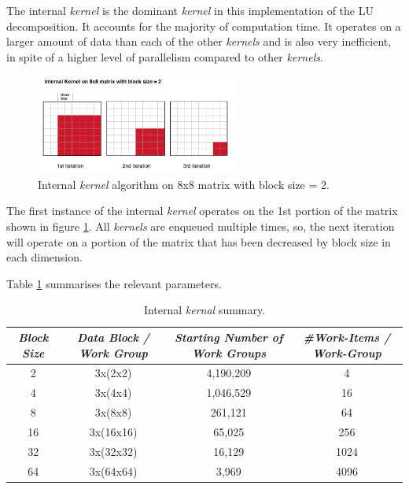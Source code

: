 \par{The internal \emph{kernel} is the dominant \emph{kernel} in this implementation of the 
    LU decomposition. It accounts for the majority of computation time. 
    It operates on a larger amount of data than each of the other \emph{kernels}
    and is also very inefficient, in spite of a higher level of parallelism 
    compared to other \emph{kernels}.}

\begin{figure}[!h]
    \centering
    \includegraphics[width=0.6\textwidth]{figures/InternalKernel2.png}
    \caption{Internal \emph{kernel} algorithm on 8x8 matrix with block size = 2.}
    \label{InternalKernel2}
\end{figure}

\par{The first instance of the internal \emph{kernel} operates on the 1st portion of 
    the matrix shown in figure \ref{InternalKernel2}. All \emph{kernels} are enqueued multiple 
    times, so, the next iteration will operate on a portion of the 
    matrix that has been decreased by block size in each dimension.}

\par{Table \ref{tab:lu3} summarises the relevant parameters.}

\begin{table}[!h]
    \centering
    \begin{tabular}{| c | c | c | c |}
    \hline
    \emph{Block Size} & \emph{Data Block / Work Group} & 
    \emph{Starting Number of Work Groups} & 
    \emph{\#Work-Items / Work-Group} \\ \hline
    2 & 3x(2x2) & 4,190,209 & 4 \\ \hline
    4 & 3x(4x4) & 1,046,529 & 16 \\ \hline
    8 & 3x(8x8) & 261,121 & 64 \\ \hline
    16 & 3x(16x16) & 65,025 & 256 \\ \hline
    32 & 3x(32x32) & 16,129 & 1024 \\ \hline
    64 & 3x(64x64) & 3,969 & 4096 \\ \hline
    \end{tabular}
    \caption{Internal \emph{kernal} summary.}
    \label{tab:lu3}
\end{table}

